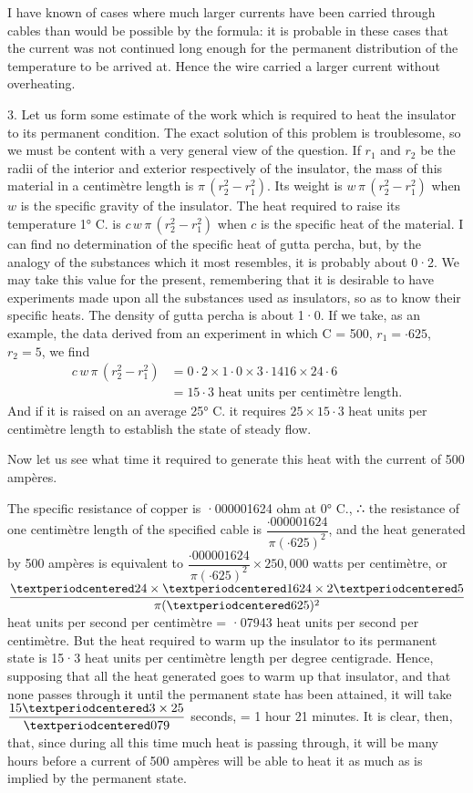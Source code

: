 \documentclass[12pt,oneside]{book}[2021/10/04]
\newcommand{\xp}{\rule[-2.2ex]{0pt}{3.4ex}}
\begin{document}
I have known of cases where much larger currents have been
carried through cables than would be possible by the formula: it
is probable in these cases that the current was not continued
long enough for the permanent distribution of the temperature to
be arrived at. Hence the wire carried a larger current without
overheating.

3. Let us form some estimate of the work which is required
to heat the insulator to its permanent condition. The exact
solution of this problem is troublesome, so we must be content
with a very general view of the question. If \(r_{1}\) and \(r_{2}\) be the
radii of the interior and exterior respectively of the insulator, the
mass of this material in a centimètre length is \(\pi\,(r^2_{2} - r^2_{1})\). Its
weight is \(w\,\pi\,(r^2_{2} - r^2_{1})\) when \(w\) is the specific gravity of the insulator.
The heat required to raise its temperature 1° C. is \(c\,w\,\pi\,(r^2_{2} - r^2_{1})\)
when \(c\) is the specific heat of the material. I can find
no determination of the specific heat of gutta percha, but, by the
analogy of the substances which it most resembles, it is probably
about 0·2. We may take this value for the present, remembering
that it is desirable to have experiments made upon all the substances
used as insulators, so as to know their specific heats. The
density of gutta percha is about 1·0. If we take, as an example,
the data derived from an experiment in which C = 500, \(r_{1} = ·625\),
\(r_{2} = 5\), we find
\begin{align*}
c\,w\,\pi\,(r^2_{2} - r^2_{1}) &= 0·2 \times 1·0 \times 3·1416 \times 24·6\\
&= 15·3 \text{ heat units per centimètre length.}
\end{align*}
And if it is raised on an average 25° C. it requires \(25 \times 15·3\)
heat units per centimètre length to establish the state of steady
flow.

Now let us see what time it required to generate this heat with
the current of 500 ampères.

The specific resistance of copper is ·000001624 ohm at 0° C.,
∴ the resistance of one centimètre length of the specified
cable is \(\dfrac{·000001624}{\pi (·625)^2}\), and the heat generated by 500 ampères is
equivalent to \(\dfrac{·000001624}{\pi (·625)^2} \times 250{,}000\) watts per centimètre, or
\(\xp\dfrac{·24 \times ·1624 \times 2·5}{\pi (·625)^2}\) heat units per second per centimètre = ·07943
heat units per second per centimètre. But the heat required to
warm up the insulator to its permanent state is 15·3 heat units
per centimètre length per degree centigrade. Hence, supposing
that all the heat generated goes to warm up that insulator, and
that none passes through it until the permanent state has been
attained, it will take \(\xp\dfrac{15·3 \times 25}{·079} \) seconds, = 1 hour 21 minutes.
It is clear, then, that, since during all this time much heat is
passing through, it will be many hours before a current of 500
ampères will be able to heat it as much as is implied by the
permanent state.
\end{document}
